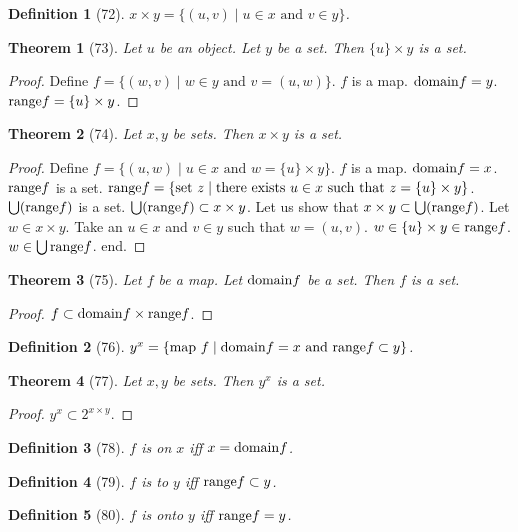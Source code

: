 \documentclass{scrartcl}
\newenvironment{forthel}{\begin{leftbar}}{\end{leftbar}}
\newtheorem*{theorem}{Theorem}
\newtheorem*{definition}{Definition}
\newcommand{\sing}[1]{\{{#1}\}}
\newcommand{\op}[2]{({#1},{#2})}
\begin{document}
\begin{forthel}
\begin{definition}[72] $x \times y = 
\{\op{u}{v} \mid u \in x \text{ and } v \in y\}$.
\end{definition}

\begin{theorem}[73] Let $u$ be an object. Let $y$ be a set.
Then $\sing{u} \times y$ is a set.
\end{theorem}
\begin{proof} Define
$f = \{\op{w}{v} \mid w \in y \text{ and } v = \op{u}{w}\}$.
$f$ is a map. 
${\rm domain} f = y$.
${\rm range} f = \sing{u} \times y$.
\end{proof}

\begin{theorem}[74] Let $x,y$ be sets. Then $x \times y$ is a set.
\end{theorem}
\begin{proof} 
Define $f = \{\op{u}{w} \mid u \in x \text{ and } w = \sing{u} \times y\}$.
$f$ is a map.
${\rm domain} f = x$.
${\rm range} f$ is a set.
${\rm range} f = \{\text{set } z \mid 
\text{there exists } u \in x \text{ such that } z = \sing{u} \times y\}$.
$\bigcup ({\rm range} f)$ is a set.
$\bigcup ({\rm range} f) \subset x \times y$.
Let us show that $x \times y \subset \bigcup ({\rm range} f)$.
Let $w \in x \times y$. Take 
an $u \in x$ and $v \in y$ such that $w = \op{u}{v}$.
$w \in \sing{u} \times y \in {\rm range} f$.
$w \in \bigcup {\rm range} f$.
end.
\end{proof}

\begin{theorem}[75] Let $f$ be a map. Let ${\rm domain} f$ be a set.
Then $f$ is a set.
\end{theorem}
\begin{proof}
$f \subset {\rm domain} f \times {\rm range} f$.
\end{proof}

\begin{definition}[76]
$y^x = \{\text{map } f \mid 
{\rm domain} f = x \text{ and } {\rm range} f \subset y\}$.
\end{definition}

\begin{theorem}[77] Let $x,y$ be sets. Then $y^x$ is a set.
\end{theorem}
\begin{proof} $y^x \subset 2^{x \times y}$.
\end{proof}

\begin{definition}[78] $f$ is \emph{on} $x$ iff $x = {\rm domain} f$.
\end{definition}

\begin{definition}[79] $f$ is \emph{to} $y$ iff ${\rm range} f \subset y$.
\end{definition}

\begin{definition}[80] $f$ is \emph{onto} $y$ iff ${\rm range} f = y$.
\end{definition}

\end{forthel}
\end{document}
